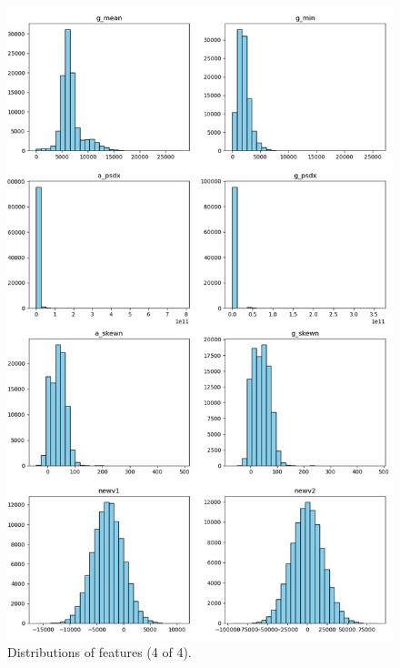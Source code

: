 \documentclass[10pt,twocolumn]{article}
\begin{document}
\begin{figure}[H]
    \centering
    \includegraphics[width=0.85\linewidth, height=0.4\textheight]{images/distribution_2.png}
    \caption{Distributions of features (4 of 4).}
    \label{fig:distribution-2-2}
\end{figure}
\end{document}
